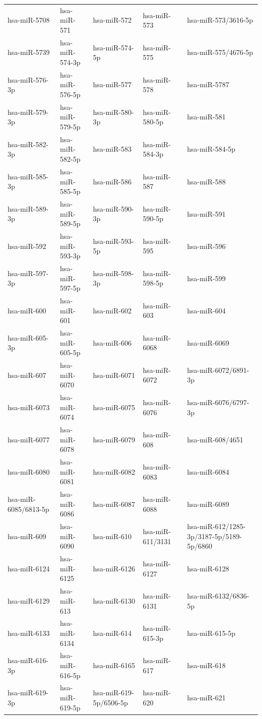 \begin{longtable}{lllll}
hsa-miR-5708 & hsa-miR-571 & hsa-miR-572 & hsa-miR-573 & hsa-miR-573/3616-5p \\
hsa-miR-5739 & hsa-miR-574-3p & hsa-miR-574-5p & hsa-miR-575 & hsa-miR-575/4676-5p \\
hsa-miR-576-3p & hsa-miR-576-5p & hsa-miR-577 & hsa-miR-578 & hsa-miR-5787 \\
hsa-miR-579-3p & hsa-miR-579-5p & hsa-miR-580-3p & hsa-miR-580-5p & hsa-miR-581 \\
hsa-miR-582-3p & hsa-miR-582-5p & hsa-miR-583 & hsa-miR-584-3p & hsa-miR-584-5p \\
hsa-miR-585-3p & hsa-miR-585-5p & hsa-miR-586 & hsa-miR-587 & hsa-miR-588 \\
hsa-miR-589-3p & hsa-miR-589-5p & hsa-miR-590-3p & hsa-miR-590-5p & hsa-miR-591 \\
hsa-miR-592 & hsa-miR-593-3p & hsa-miR-593-5p & hsa-miR-595 & hsa-miR-596 \\
hsa-miR-597-3p & hsa-miR-597-5p & hsa-miR-598-3p & hsa-miR-598-5p & hsa-miR-599 \\
hsa-miR-600 & hsa-miR-601 & hsa-miR-602 & hsa-miR-603 & hsa-miR-604 \\
hsa-miR-605-3p & hsa-miR-605-5p & hsa-miR-606 & hsa-miR-6068 & hsa-miR-6069 \\
hsa-miR-607 & hsa-miR-6070 & hsa-miR-6071 & hsa-miR-6072 & hsa-miR-6072/6891-3p \\
hsa-miR-6073 & hsa-miR-6074 & hsa-miR-6075 & hsa-miR-6076 & hsa-miR-6076/6797-3p \\
hsa-miR-6077 & hsa-miR-6078 & hsa-miR-6079 & hsa-miR-608 & hsa-miR-608/4651 \\
hsa-miR-6080 & hsa-miR-6081 & hsa-miR-6082 & hsa-miR-6083 & hsa-miR-6084 \\
hsa-miR-6085/6813-5p & hsa-miR-6086 & hsa-miR-6087 & hsa-miR-6088 & hsa-miR-6089 \\
hsa-miR-609 & hsa-miR-6090 & hsa-miR-610 & hsa-miR-611/3131 & hsa-miR-612/1285-3p/3187-5p/5189-5p/6860 \\
hsa-miR-6124 & hsa-miR-6125 & hsa-miR-6126 & hsa-miR-6127 & hsa-miR-6128 \\
hsa-miR-6129 & hsa-miR-613 & hsa-miR-6130 & hsa-miR-6131 & hsa-miR-6132/6836-5p \\
hsa-miR-6133 & hsa-miR-6134 & hsa-miR-614 & hsa-miR-615-3p & hsa-miR-615-5p \\
hsa-miR-616-3p & hsa-miR-616-5p & hsa-miR-6165 & hsa-miR-617 & hsa-miR-618 \\
hsa-miR-619-3p & hsa-miR-619-5p & hsa-miR-619-5p/6506-5p & hsa-miR-620 & hsa-miR-621 \\

\end{longtable}
